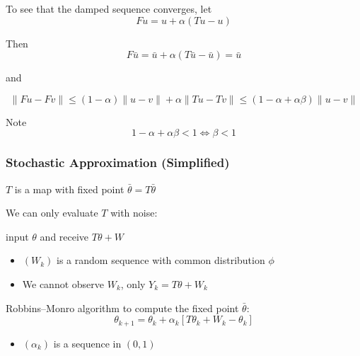 \documentclass[xcolor=dvipsnames]{beamer}  %
\renewcommand{\leq}{\leqslant}
\newcommand{\1}{\mathbbm 1}
\begin{document}
\begin{frame}

    To see that the damped sequence converges, let
    \begin{equation*}
        Fu = u + \alpha (Tu - u)
    \end{equation*}

    Then
    \begin{equation*}
        F \bar u 
        = \bar u + \alpha (T \bar u - \bar u)
        = \bar u
    \end{equation*}

    and

    \begin{equation*}
        \| Fu - Fv\|
        \leq (1-\alpha)\|u - v\| + \alpha \| Tu - Tv\|
        \leq (1-\alpha + \alpha \beta)\| u - v\|
    \end{equation*}

    Note 
    \begin{equation*}
        1-\alpha + \alpha \beta < 1
        \iff \beta < 1
    \end{equation*}
    
\end{frame}

\begin{frame}
    \frametitle{Stochastic Approximation (Simplified)}

    $T$ is a map with fixed point $\bar \theta = T \bar \theta$

    We can only evaluate $T$ with noise:
    \begin{center}
        input $\theta$ and receive $T \theta + W$ 
    \end{center}

    \begin{itemize}
        \item $(W_k)$ is a random sequence with common distribution $\phi$
        \item We cannot observe $W_k$, only $Y_k = T \theta + W_k$
    \end{itemize}

    Robbins--Monro algorithm to compute the fixed point $\bar \theta$:
    \begin{equation*}
        \theta_{k+1} 
        = \theta_k + \alpha_k [ T \theta_k + W_k - \theta_k ]
    \end{equation*}

    \begin{itemize}
        \item $(\alpha_k)$ is a sequence in $(0,1)$
    \end{itemize}

\end{frame}
\end{document}
